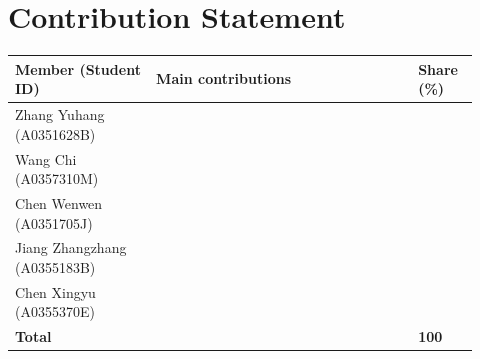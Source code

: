 \section*{Contribution Statement}

\begin{center}
\begin{tabular}{@{}>{\raggedright\arraybackslash}p{0.28\linewidth}
                >{\raggedright\arraybackslash}p{0.52\linewidth}
                >{\centering\arraybackslash}p{0.12\linewidth}@{}}
\toprule
\textbf{Member (Student ID)} & \textbf{Main contributions} & \textbf{Share (\%)} \\
\midrule
Zhang Yuhang (A0351628B)     & \todo{} & \\
Wang Chi (A0357310M)         & \todo{} & \\
Chen Wenwen (A0351705J)      & \todo{} & \\
Jiang Zhangzhang (A0355183B) & \todo{} & \\
Chen Xingyu (A0355370E)      & \todo{} & \\
\midrule
\textbf{Total} & & \textbf{100} \\
\bottomrule
\end{tabular}
\end{center}
